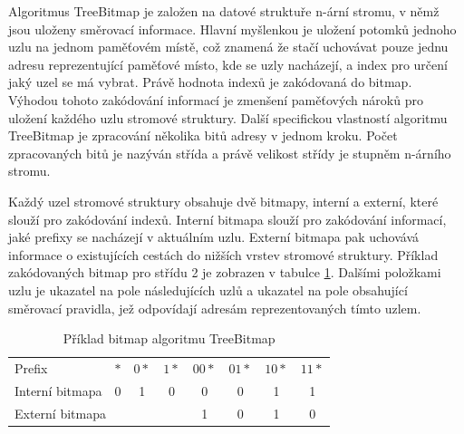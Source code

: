 Algoritmus TreeBitmap je založen na datové struktuře n-ární stromu, v němž jsou uloženy směrovací informace.
Hlavní myšlenkou je uložení potomků jednoho uzlu na jednom paměťovém místě, což znamená že stačí uchovávat pouze jednu
adresu reprezentující paměťové místo, kde se uzly nacházejí, a index pro určení jaký uzel se má vybrat. Právě
hodnota indexů je zakódovaná do bitmap.
Výhodou tohoto zakódování informací je zmenšení paměťových nároků pro uložení každého uzlu stromové struktury.
Další specifickou vlastností algoritmu TreeBitmap je zpracování několika bitů adresy v jednom kroku.
Počet zpracovaných bitů je nazýván střída a právě velikost střídy je stupněm n-árního stromu.

Každý uzel stromové struktury obsahuje dvě bitmapy, interní a externí, které slouží pro zakódování indexů.
Interní bitmapa slouží pro zakódování informací, jaké prefixy se nacházejí v aktuálním uzlu.
Externí bitmapa pak uchovává informace o existujících cestách do nižších vrstev stromové struktury.
Příklad zakódovaných bitmap pro střídu 2 je zobrazen v tabulce \ref{tab:tbm-bitmaps}.
Dalšími položkami uzlu je ukazatel na pole následujících uzlů a ukazatel na pole obsahující směrovací pravidla,
jež odpovídají adresám reprezentovaných tímto uzlem.

\begin{table}
	\center
    \begin{tabular}{|l||c|c|c|c|c|c|c|}
    \hline
    Prefix & $*$ & $0*$ & $1*$ & $00*$ & $01*$ & $10*$ & $11*$ \\ \hhline{|=#=|=|=|=|=|=|=|}
    Interní bitmapa & 0 & 1 & 0 & 0 & 0 & 1 & 1 \\ \hline
    \multicolumn{4}{|l|}{Externí bitmapa} & 1 & 0 & 1 & 0 \\ \hline
    \end{tabular}
    \caption{Příklad bitmap algoritmu TreeBitmap}
    \label{tab:tbm-bitmaps}
\end{table}

